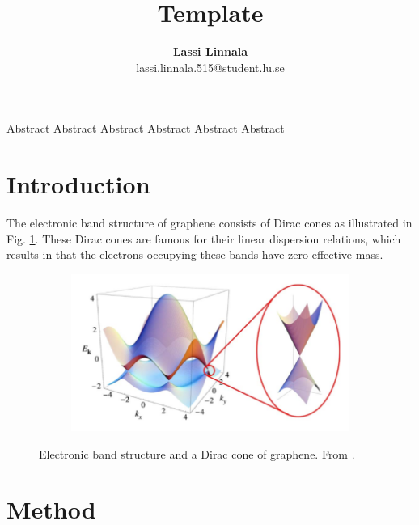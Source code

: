 \documentclass[12pt,a4paper,twoside]{article}
\numberwithin{equation}{section}
\renewcommand{\_}{\textscale{.7}{\textunderscore}}
\begin{document}
\title{Template}


\author{\textbf{Lassi Linnala} \\ lassi.linnala.515@student.lu.se}


\maketitle



\vspace{1cm}

{Abstract Abstract Abstract Abstract Abstract Abstract}

\thispagestyle{empty}
\newpage
{}

\newpage 
\tableofcontents
\clearpage
{}
\setcounter{page}{1}


\section{Introduction} 
The electronic band structure of graphene consists of Dirac cones as illustrated in Fig. \ref{dirac-cone-gr}. These Dirac cones are famous for their linear dispersion relations, which results in that the electrons occupying these bands have zero effective mass.
\begin{figure}[H]
	\centering
	\begin{subfigure}{0.6\linewidth}
		\includegraphics[width=1.0\linewidth]{Gr-dirac-cone.png}
	\end{subfigure}
	\caption{Electronic band structure and a Dirac cone of graphene. From {\cite{Castro-Neto}}.}
	\label{dirac-cone-gr}
\end{figure} 

\section{Method}
\end{document}
